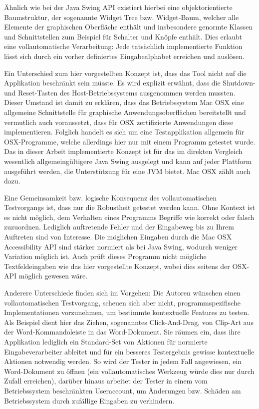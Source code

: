 Ähnlich wie bei der Java Swing API existiert hierbei eine objektorientierte Baumstruktur,
der sogenannte \glqq{}Widget Tree\grqq{} bzw. Widget-Baum, welcher alle Elemente der graphischen Oberfläche enthält
und insbesondere genormte Klassen und Schnittstellen zum Beispiel für Schalter
und Knöpfe enthält. Dies erlaubt eine vollautomatische Verarbeitung:
Jede tatsächlich implementierte Funktion lässt sich durch ein vorher definiertes
\glqq{}Eingabealphabet\grqq{} erreichen und auslösen.

Ein Unterschied zum
hier vorgestellten Konzept ist, dass das Tool nicht auf die Applikation beschränkt sein müsste. Es wird
explizit erwähnt, dass die Shutdown- und Reset-Tasten des Host-Betriebssystems ausgenommen werden
mussten. Dieser Umstand ist damit zu erklären, dass das Betriebssystem Mac OSX eine allgemeine
Schnittstelle für graphische Anwendungsoberflächen bereitstellt und vermutlich auch voraussetzt,
dass für OSX zertifizierte Anwendungen diese implementieren. Folglich handelt es sich um eine
Testapplikation allgemein für OSX-Programme, welche allerdings hier nur mit einem Programm
getestet wurde. Das in dieser Arbeit implementierte Konzept ist für das im direkten Vergleich 
wesentlich allgemeingültigere Java Swing ausgelegt und kann auf jeder Plattform ausgeführt werden, 
die Unterstützung für eine JVM bietet. Mac OSX zählt auch dazu.

Eine Gemeinsamkeit bzw. logische Konsequenz des vollautomatischen Testvorgangs ist, dass nur
die Robustheit getestet werden kann. Ohne Kontext ist es nicht möglich, dem Verhalten eines
Programms Begriffe wie \glqq{}korrekt\grqq{} oder \glqq{}falsch\grqq{} zuzuordnen. Lediglich auftretende
Fehler und der Eingabeweg bis zu Ihrem Auftreten sind von Interesse.
Die möglichen Eingaben durch die \glqq{}Mac OSX Accessibility API\grqq{} sind stärker normiert als bei
Java Swing, wodurch weniger Variation möglich ist. Auch prüft dieses Programm nicht mögliche
Textfeldeingaben wie das hier vorgestellte Konzept, wobei dies seitens der OSX-API möglich gewesen wäre.

Anderere Unterschiede finden sich im Vorgehen: Die Autoren wünschen einen vollautomatischen
Testvorgang, scheuen sich aber nicht, programmspezifische Implementationen vorzunehmen, um
bestimmte kontextuelle Features zu testen. Als Beispiel dient hier das Ziehen, sogenanntes
\glqq{}Click-And-Drag\grqq{}, von Clip-Art aus der Word-Kommandoleiste in das Word-Dokument.
Sie räumen ein, dass ihre Applikation lediglich ein Standard-Set von Aktionen für
normierte Eingabeverarbeiter ableitet und für ein besseres Testergebnis gewisse
kontextuelle Aktionen notwendig werden. So wird der Tester in jedem Fall angewiesen,
ein Word-Dokument zu öffnen (ein vollautomatisches Werkzeug würde dies nur durch Zufall erreichen),
darüber hinaus arbeitet der Tester in einem vom Betriebssystem beschränkten Useraccount,
um Änderungen bzw. Schäden am Betriebssystem durch zufällige Eingaben zu verhindern.

